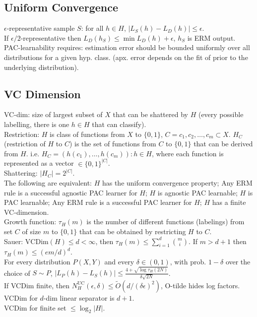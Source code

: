 \subsection*{Uniform Convergence}

$\epsilon$-representative sample $S$: for all $h \in H$, $|L_S(h) - L_D(h)| \leq \epsilon$.\\
If $\epsilon / 2$-representative then $L_D(h_S) \leq \min L_D(h) + \epsilon$, $h_S$ is ERM output.\\
PAC-learnability requires: estimation error should be bounded uniformly over all distributions for a given hyp. class. (apx. error depends on the fit of prior to the underlying distribution).

\subsection*{VC Dimension}

VC-dim: size of largest subset of $X$ that can be shattered by $H$ (every possible labelling, there is one $h \in H$ that can classify).\\
Restriction: $H$ is class of functions from $X$ to $\{0, 1\}$, $C={c_1, c_2, \dots, c_m} \subset X$. $H_C$ (restriction of $H$ to $C$) is the set of functions from $C$ to $\{0, 1\}$ that can be derived from $H$. i.e. $H_C = {(h(c_1), \dots, h(c_m)): h\in H}$, where each function is represented as a vector $\in \{0, 1\}^{|C|}$.\\
Shattering: $|H_C| = 2^{|C|}$.\\
The following are equivalent: $H$ has the uniform convergence property; Any ERM rule is a successful agnostic PAC learner for $H$; $H$ is agnostic PAC learnable; $H$ is PAC learnable; Any ERM rule is a successful PAC learner for $H$; $H$ has a finite VC-dimension.\\
Growth function: $\tau_H(m)$ is the number of different functions (labelings) from set $C$ of size $m$ to $\{0, 1\}$ that can be obtained by restricting $H$ to $C$.\\
Sauer: $\text{VCDim}(H) \leq d < \infty$, then $\tau_H(m) \leq \sum_{i=1}^d \binom{m}{i}$. If $m > d + 1$ then $\tau_H(m) \leq (em/d)^d$.\\
For every distribution $P(X, Y)$ and every $\delta \in (0, 1)$, with prob. $1 - \delta$ over the choice of $S \sim P$, $|L_P(h) - L_S(h)| \leq \frac{4 + \sqrt{\log \tau_H(2N)}}{\delta \sqrt{2N}}$.\\
If VCDim finite, then $N_{H}^{\text{UC}}(\epsilon, \delta) \leq \widetilde{O}(d/(\delta \epsilon)^2)$, O-tilde hides log factors.\\
VCDim for $d$-dim linear separator is $d+1$.\\
VCDim for finite set $\leq \log_2|H|$.

